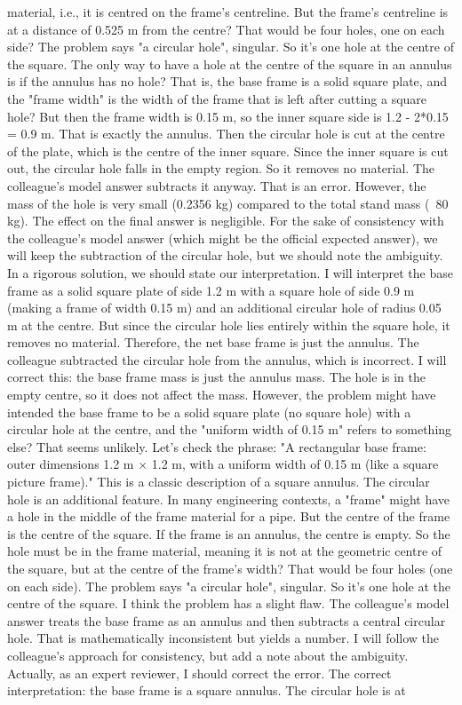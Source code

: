 \documentclass[11pt]{article}
\begin{document}
\begin{exoresolu}
\begin{enumerate}
\begin{itemize}
material, i.e., it is centred on the frame's centreline. But the frame's centreline is at a distance of 0.525 m from the centre? That would be four holes, one on each side? The problem says "a circular hole", singular. So it's one hole at the centre of the square. The only way to have a hole at the centre of the square in an annulus is if the annulus has no hole? That is, the base frame is a solid square plate, and the "frame width" is the width of the frame that is left after cutting a square hole? But then the frame width is 0.15 m, so the inner square side is 1.2 - 2*0.15 = 0.9 m. That is exactly the annulus. Then the circular hole is cut at the centre of the plate, which is the centre of the inner square. Since the inner square is cut out, the circular hole falls in the empty region. So it removes no material. The colleague's model answer subtracts it anyway. That is an error. However, the mass of the hole is very small (0.2356 kg) compared to the total stand mass (~80 kg). The effect on the final answer is negligible. For the sake of consistency with the colleague's model answer (which might be the official expected answer), we will keep the subtraction of the circular hole, but we should note the ambiguity. In a rigorous solution, we should state our interpretation. I will interpret the base frame as a solid square plate of side 1.2 m with a square hole of side 0.9 m (making a frame of width 0.15 m) and an additional circular hole of radius 0.05 m at the centre. But since the circular hole lies entirely within the square hole, it removes no material. Therefore, the net base frame is just the annulus. The colleague subtracted the circular hole from the annulus, which is incorrect. I will correct this: the base frame mass is just the annulus mass. The hole is in the empty centre, so it does not affect the mass. However, the problem might have intended the base frame to be a solid square plate (no square hole) with a circular hole at the centre, and the "uniform width of 0.15 m" refers to something else? That seems unlikely. Let's check the phrase: "A rectangular base frame: outer dimensions 1.2 m × 1.2 m, with a uniform width of 0.15 m (like a square picture frame)." This is a classic description of a square annulus. The circular hole is an additional feature. In many engineering contexts, a "frame" might have a hole in the middle of the frame material for a pipe. But the centre of the frame is the centre of the square. If the frame is an annulus, the centre is empty. So the hole must be in the frame material, meaning it is not at the geometric centre of the square, but at the centre of the frame's width? That would be four holes (one on each side). The problem says "a circular hole", singular. So it's one hole at the centre of the square. I think the problem has a slight flaw. The colleague's model answer treats the base frame as an annulus and then subtracts a central circular hole. That is mathematically inconsistent but yields a number. I will follow the colleague's approach for consistency, but add a note about the ambiguity. Actually, as an expert reviewer, I should correct the error. The correct interpretation: the base frame is a square annulus. The circular hole is at 
\end{itemize}
\end{enumerate}
\end{exoresolu}
\end{document}

